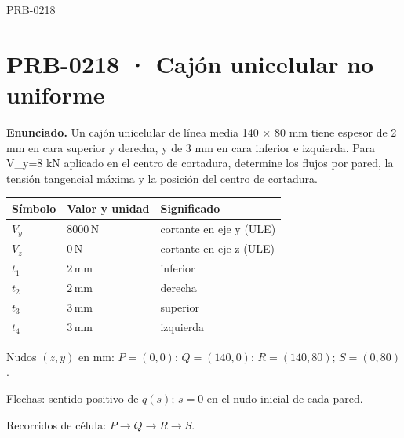 \begin{studiumworked}{PRB-0218}

\section{PRB-0218 · Cajón unicelular no uniforme}

\textbf{Enunciado.} Un cajón unicelular de línea media 140 \ensuremath{\times} 80 mm tiene espesor de 2 mm en cara superior y derecha, y de 3 mm en cara inferior e izquierda. Para V\_y=8 kN aplicado en el centro de cortadura, determine los flujos por pared, la tensión tangencial máxima y la posición del centro de cortadura.

\par\medskip\noindent\begin{tabular}{@{}p{.18\linewidth}p{.26\linewidth}p{.48\linewidth}@{}}
\toprule Símbolo & Valor y unidad & Significado\\\midrule
$V_{y}$ & $8000\,\mathrm{N}$ & cortante en eje y (ULE)\\
$V_{z}$ & $0\,\mathrm{N}$ & cortante en eje z (ULE)\\
$t_{1}$ & $2\,\mathrm{mm}$ & inferior\\
$t_{2}$ & $2\,\mathrm{mm}$ & derecha\\
$t_{3}$ & $3\,\mathrm{mm}$ & superior\\
$t_{4}$ & $3\,\mathrm{mm}$ & izquierda\\
\bottomrule\end{tabular}\par\medskip

\par\medskip\noindent\begin{minipage}{\linewidth}\centering
{}
\par\small Nudos $(z,y)$ en mm: $P=(0,0)$; $Q=(140,0)$; $R=(140,80)$; $S=(0,80)$.
\par\small Flechas: sentido positivo de $q(s)$; $s=0$ en el nudo inicial de cada pared.
\par\small Recorridos de célula: $P\to Q\to R\to S$.
\par\normalsize\end{minipage}\par\medskip


\end{studiumworked}
